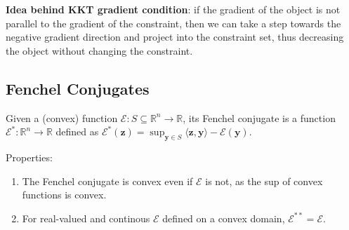 \textbf{Idea behind KKT gradient condition}: if the gradient of the object is not parallel to the gradient of the constraint, then we can take a step towards the negative gradient direction and project into the constraint set, thus decreasing the object without changing the constraint.

\subsection{Fenchel Conjugates}

 Given a (convex) function $\mathcal{E}: S \subseteq \mathbb{R}^{n} \rightarrow \mathbb{R}$, its Fenchel conjugate is a function $\mathcal{E}^{*}: \mathbb{R}^{n} \rightarrow \mathbb{R}$ defined as
$
\mathcal{E}^{*}(\boldsymbol{z})=\sup _{\boldsymbol{y} \in S}\langle\boldsymbol{z}, \boldsymbol{y}\rangle-\mathcal{E}(\boldsymbol{y}).
$

Properties:
\begin{enumerate}
    \item The Fenchel conjugate is convex even if $\mathcal{E}$ is not, as the sup of convex functions is convex.
    \item For real-valued and continous $\mathcal{E}$ defined on a convex domain, $\mathcal{E}^{**} = \mathcal{E}$.
\end{enumerate}
